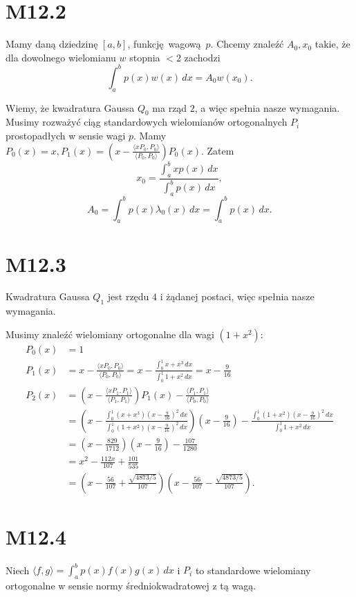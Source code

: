 \documentclass[a4paper, 12pt]{article}
\title{}
\author{Wiktor Kuchta}
\date{\vspace{-4ex}}
\newcommand{\+}{\enspace}
\begin{document}
\maketitle

\section*{M12.2}
Mamy daną dziedzinę $[a,b]$, funkcję wagową $p$.
Chcemy znaleźć $A_0, x_0$ takie,
że dla dowolnego wielomianu $w$ stopnia $<2$ zachodzi
$$∫_a^b p(x)w(x) \, dx = A_0 w(x_0).$$

Wiemy, że kwadratura Gaussa $Q_0$ ma rząd $2$, a więc spełnia nasze wymagania.
Musimy rozważyć ciąg standardowych wielomianów ortogonalnych $P_i$
prostopadłych w sensie wagi $p$.
Mamy $P_0(x) = x, P_1(x) = \left(x - \frac{⟨x P_0, P_0⟩}{⟨P_0, P_0⟩}\right)P_0(x)$.
Zatem
$$x_0 = \frac{∫_a^b x p(x)\,dx}{∫_a^b p(x)\,dx},$$
$$A_0 = ∫_a^b p(x) λ_0(x) \, dx = ∫_a^b p(x) \, dx.$$

\section*{M12.3}
Kwadratura Gaussa $Q_1$ jest rzędu $4$ i żądanej postaci,
więc spełnia nasze wymagania.

Musimy znaleźć wielomiany ortogonalne dla wagi $(1+x^2)$:
\begin{align*}
	P_0(x) &= 1 \\
	P_1(x) &= x - \frac{⟨x P_0, P_0⟩}{⟨P_0, P_0⟩} = x - \frac{∫_0^1 x + x^3\,dx}{∫_0^1 1 + x^2 \, dx} =  x-\frac{9}{16} \\
	P_2(x) &= \left(x - \frac{⟨x P_1, P_1⟩}{⟨P_1, P_1⟩}\right)P_1(x) - \frac{⟨P_1,P_1⟩}{⟨P_0,P_0⟩} \\
	&= \left(x - \frac{∫_0^1 (x+x^3)\left(x- \frac{9}{16}\right)^2\,dx}{∫_0^1
	(1+x^2)\left(x-
	\frac{9}{16}\right)^2\,dx}\right)\left(x-\frac{9}{16}\right) - \frac{∫_0^1
	(1+x^2)\left(x- \frac{9}{16}\right)^2\,dx}{∫_0^1 1 + x^2 \, dx} \\
	&= \left(x - \frac{829}{1712}\right)\left(x-\frac{9}{16}\right) - \frac{107}{1280} \\
	&= x^2 - \frac{112 x}{107} + \frac{101}{535} \\
	&= \left(x - \frac{56}{107} + \frac{\sqrt{4873/5}}{107}\right)\left(x - \frac{56}{107} - \frac{\sqrt{4873/5}}{107}\right).
\end{align*}

\section*{M12.4}
Niech $⟨f, g⟩ = ∫_a^b p(x) f(x) g(x) \, dx$ i $P_i$ to standardowe wielomiany
ortogonalne w sensie normy średniokwadratowej z tą wagą.
\end{document}
